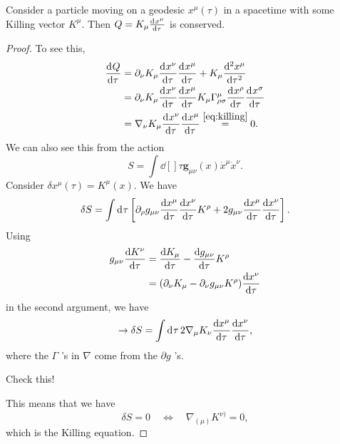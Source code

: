 \begin{claim}
  Consider a particle moving on a geodesic $x^{\mu}(\tau)$ in a spacetime with some Killing vector $K^{\mu}$.
  Then $Q = K_{\mu} \dv[]{x^{\mu}}{\tau}$ is conserved.
\end{claim}
\begin{proof}
  To see this,
  \begin{align}
    \dv[]{Q}{\tau} &= \partial_{\nu} K_{\mu} \dv[]{x^{\nu}}{\tau} \dv[]{x^{\mu}}{\tau} + K_{\mu} \dv[2]{x^{\mu}}{\tau} \\
    &= \partial_{\nu} K_{\mu} \dv[]{x^{\nu}}{\tau} \dv[]{x^{\mu}}{\tau}  K_{\mu} \Gamma^{\mu}_{\rho\sigma} \dv[]{x^{\rho}}{\tau} \dv[]{x^{\sigma}}{\tau} \\
    &= \nabla_{\nu} K_{\mu} \dv[]{x^{\nu}}{\tau} \dv[]{x^{\mu}}{\tau} \stackrel{\eqref{eq:killing}}{=} 0.
  \end{align}
  We can also see this from the action
  \begin{equation}
    S = \int \dd[]{\tau} \mathbf{g}_{\mu\nu} (x) \dot{x}^{\mu} \dot{x}^{\nu}.
  \end{equation}
  Consider $\delta x^{\mu} (\tau) = K^{\mu}(x)$. We have
  \begin{equation}
    \delta S = \int \dd[]{\tau} \left[ \partial_{\rho} g_{\mu\nu} \dv{x^{\mu}}{\tau} \dv{x^{\nu}}{\tau} K^{\rho} + 2g_{\mu\nu} \dv{x^{\mu}}{\tau} \dv{x^{\nu}}{\tau} \right].
  \end{equation}
  Using 
  \begin{align}
    g_{\mu\nu} \dv{K^{\nu}}{\tau} &=\dv{K_{\mu}}{\tau} - \dv{g_{\mu\nu}}{\tau} K^{\rho} \\
				  &= (\partial_{\nu} K_{\mu} - \partial_{\nu} g_{\mu\nu} K^{\rho}) \dv{x^{\nu}}{\tau}
  \end{align}
  in the second argument, we have
  \begin{equation}
    \rightarrow \delta S = \int \dd[]{\tau} 2 \nabla_{\mu} K_{\nu} \dv{x^{\mu}}{\tau} \dv{x^{\nu}}{\tau},
  \end{equation}
  where the $\Gamma$ 's in $\nabla$ come from the $\partial g$ 's.
  \begin{exercise}
    Check this!
  \end{exercise}
  This means that we have
  \begin{equation}
    \delta S = 0 \quad \iff \quad \nabla_{(\mu)} K^{\nu)} = 0,
  \end{equation}
  which is the Killing equation.
\end{proof}
